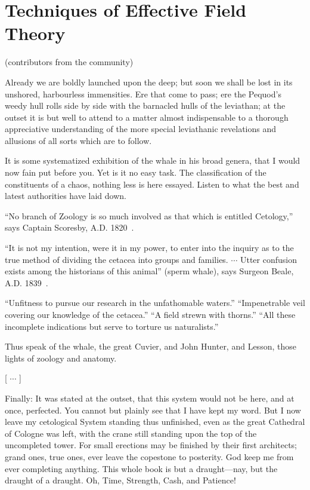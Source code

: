 
\setcounter{chapter}{1} 


\chapter{Techniques of Effective Field Theory}

   {(contributors from the community)}


Already we are boldly launched upon the deep; but soon we shall be lost in its unshored, harbourless immensities. Ere that come to pass; ere the Pequod’s weedy hull rolls side by side with the barnacled hulls of the leviathan; at the outset it is but well to attend to a matter almost indispensable to a thorough appreciative understanding of the more special leviathanic revelations and allusions of all sorts which are to follow.

It is some systematized exhibition of the whale in his broad genera, that I would now fain put before you. Yet is it no easy task. The classification of the constituents of a chaos, nothing less is here essayed. Listen to what the best and latest authorities have laid down.

``No branch of Zoology is so much involved as that which is entitled Cetology,'' says Captain Scoresby, A.D. 1820~\cite{T2-Scoresby}.

``It is not my intention, were it in my power, to enter into the inquiry as to the true method of dividing the cetacea into groups and families. $\cdots$ Utter confusion exists among the historians of this animal'' (sperm whale), says Surgeon Beale, A.D. 1839~\cite{T2-Beale}.

``Unfitness to pursue our research in the unfathomable waters.'' ``Impenetrable veil covering our knowledge of the cetacea.''  ``A field strewn with thorns.'' ``All these incomplete indications but serve to torture us naturalists.''

Thus speak of the whale, the great Cuvier, and John Hunter, and Lesson, those lights of zoology and anatomy.

[ $\cdots$ ]

Finally: It was stated at the outset, that this system would not be here, and at once, perfected. You cannot but plainly see that I have kept my word. But I now leave my cetological System standing thus unfinished, even as the great Cathedral of Cologne was left, with the crane still standing upon the top of the uncompleted tower. For small erections may be finished by their first architects; grand ones, true ones, ever leave the copestone to posterity. God keep me from ever completing anything. This whole book is but a draught---nay, but the draught of a draught. Oh, Time, Strength, Cash, and Patience!



